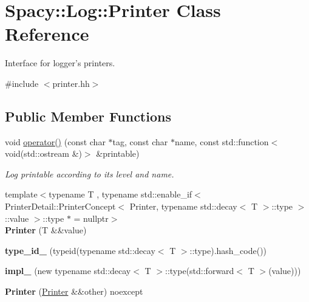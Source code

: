 \hypertarget{classSpacy_1_1Log_1_1Printer}{\section{\-Spacy\-:\-:\-Log\-:\-:\-Printer \-Class \-Reference}
\label{classSpacy_1_1Log_1_1Printer}
}


\-Interface for logger's printers.  




{\ttfamily \#include $<$printer.\-hh$>$}

\subsection*{\-Public \-Member \-Functions}
\begin{DoxyCompactItemize}
\item 
void \hyperlink{classSpacy_1_1Log_1_1Printer_a7cbc9a51fb4caf02a4fd46de907af6e9}{operator()} (const char $\ast$tag, const char $\ast$name, const std\-::function$<$ void(std\-::ostream \&)$>$ \&printable)
\begin{DoxyCompactList}\small\item\em \-Log printable according to its level and name. \end{DoxyCompactList}\item 
\hypertarget{classSpacy_1_1Log_1_1Printer_a808ff6fbaed9e16053d829b9ac72a052}{{\footnotesize template$<$typename T , typename std\-::enable\-\_\-if$<$ Printer\-Detail\-::\-Printer\-Concept$<$ Printer, typename std\-::decay$<$ T $>$\-::type $>$\-::value $>$\-::type $\ast$  = nullptr$>$ }\\{\bfseries \-Printer} (\-T \&\&value)}\label{classSpacy_1_1Log_1_1Printer_a808ff6fbaed9e16053d829b9ac72a052}

\item 
\hypertarget{classSpacy_1_1Log_1_1Printer_a13a227987679a7c792778d774255007c}{{\bfseries type\-\_\-id\-\_\-} (typeid(typename std\-::decay$<$ \-T $>$\-::type).hash\-\_\-code())}\label{classSpacy_1_1Log_1_1Printer_a13a227987679a7c792778d774255007c}

\item 
\hypertarget{classSpacy_1_1Log_1_1Printer_af6475bf9b2cc37141d99a3aa304f954e}{{\bfseries impl\-\_\-} (new typename std\-::decay$<$ \-T $>$\-::type(std\-::forward$<$ \-T $>$(value)))}\label{classSpacy_1_1Log_1_1Printer_af6475bf9b2cc37141d99a3aa304f954e}

\item 
\hypertarget{classSpacy_1_1Log_1_1Printer_a6bf9ec926eff53a022105e92c590ee87}{{\bfseries \-Printer} (\hyperlink{classSpacy_1_1Log_1_1Printer}{\-Printer} \&\&other) noexcept}\label{classSpacy_1_1Log_1_1Printer_a6bf9ec926eff53a022105e92c590ee87}


\end{DoxyCompactItemize}
